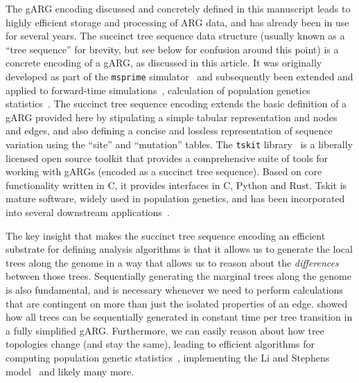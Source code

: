 \documentclass{article}
\begin{document}
The gARG encoding discussed and concretely defined in this manuscript
leads to highly efficient storage and processing of ARG data,
and has already been in use for several years.
The succinct tree sequence data structure (usually known as a ``tree sequence''
for brevity, but see below for confusion around this point)
is a concrete encoding of a gARG, as discussed in this article.
It was originally developed as part of the \texttt{msprime}
simulator~\citep{kelleher2016efficient} and subsequently been
extended and applied to forward-time
simulations~\citep{kelleher2018efficient,haller2018tree},
calculation of population genetics statistics~\citep{ralph2020efficiently}.
The succinct tree sequence encoding extends the basic definition
of a gARG provided here by stipulating a
simple tabular representation and nodes and edges,
and also defining a concise and lossless representation of
sequence variation using the ``site'' and  ``mutation'' tables.
The \texttt{tskit} library~\citep{tskit2023tskit} is a liberally
licensed open source toolkit that provides a comprehensive suite
of tools for working with gARGs (encoded as a succinct tree sequence).
Based on core functionality written
in C, it provides interfaces in C, Python and Rust.
Tskit is mature software, widely used in population genetics, and
has been incorporated into several downstream
applications~\citep[e.g.,][]{haller2019slim,speidel2019method,
adrion2020community,
terasaki2021geonomics,
baumdicker2021efficient,
fan2022genealogical,korfmann2022weak,
mahmoudi2022bayesian,petr2022slendr,rasmussen2022espalier,
zhang2023biobank}.

The key insight that makes the succinct tree sequence encoding
an efficient substrate for defining analysis algorithms is that
it allows us to generate the local trees along the genome
in a way that allows us to reason about the \emph{differences}
between those trees.
Sequentially generating the marginal trees along the genome
is also fundamental, and is necessary whenever we need to
perform calculations that are contingent on more than just the
isolated properties of an edge. \cite{kelleher2016efficient}
showed how all trees can be sequentially generated in
constant time per tree transition in a fully simplified gARG.
Furthermore, we can easily reason about how tree topologies
change (and stay the same), leading to efficient algorithms
for computing population genetic
statistics~\citep{kelleher2016efficient,kelleher2018efficient},
implementing the Li and Stephens
model~\citep{kelleher2019inferring,wohns2022unified}
and likely many more.
\end{document}
